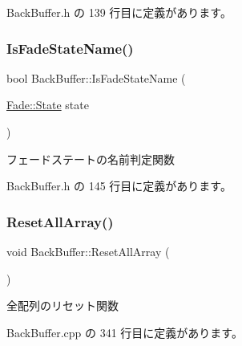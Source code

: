  Back\+Buffer.\+h の 139 行目に定義があります。

\mbox{\label{class_back_buffer_a1c13a0de1f95b8f2fea929e9306d426a}} 
\subsubsection{\texorpdfstring{Is\+Fade\+State\+Name()}{IsFadeStateName()}}
{\footnotesize\ttfamily bool Back\+Buffer\+::\+Is\+Fade\+State\+Name (\begin{DoxyParamCaption}\item[{\mbox{\hyperlink{class_fade_ae77826bf3ff2ab95fb7b3b6f95cba80a}{Fade\+::\+State}}}]{state }\end{DoxyParamCaption})\hspace{0.3cm}{\ttfamily [inline]}}



フェードステートの名前判定関数 



 Back\+Buffer.\+h の 145 行目に定義があります。

\mbox{\label{class_back_buffer_a04e942576ac5de94d16764d347111234}} 
\subsubsection{\texorpdfstring{Reset\+All\+Array()}{ResetAllArray()}}
{\footnotesize\ttfamily void Back\+Buffer\+::\+Reset\+All\+Array (\begin{DoxyParamCaption}{ }\end{DoxyParamCaption})}



全配列のリセット関数 



 Back\+Buffer.\+cpp の 341 行目に定義があります。

\mbox{\label{class_back_buffer_a5c9341c9d26576781ec9abb55b937bda}} 
